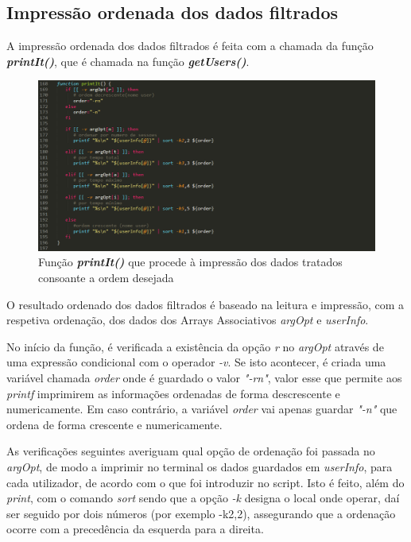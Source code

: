 \documentclass[10pt,portuguese]{article}
\begin{document}
\subsection{Impressão ordenada dos dados filtrados}
\par A impressão ordenada dos dados filtrados é feita com a chamada da função \textbf{\textit{printIt()}}, que é chamada na função \textbf{\textit{getUsers()}}.
\begin{figure}[!h]
    \centering
    \includegraphics[width=\textwidth]{printit.png}
    \caption{Função \textbf{\textit{printIt()}} que procede à impressão dos dados tratados consoante a ordem desejada}
\end{figure}
\par O resultado ordenado dos dados filtrados é baseado na leitura e impressão, com a respetiva ordenação, dos dados dos Arrays Associativos \textit{argOpt} e \textit{userInfo}.
\par No início da função, é verificada a existência da opção \textit{r} no \textit{argOpt} através de uma expressão condicional com o operador \textit{-v}. Se isto acontecer, é criada uma variável chamada \textit{order} onde é guardado o valor \textit{"-rn"}, valor esse que permite aos \textit{printf} imprimirem as informações ordenadas de forma descrescente e numericamente. Em caso contrário, a variável \textit{order} vai apenas guardar \textit{"-n"} que ordena de forma crescente e numericamente.
\par As verificações seguintes averiguam qual opção de ordenação foi passada no \textit{argOpt}, de modo a imprimir no terminal os dados guardados em \textit{userInfo}, para cada utilizador, de acordo com o que foi introduzir no script. Isto é feito, além do \textit{print}, com o comando \textit{sort} sendo que a opção \textit{-k} designa o local onde operar, daí ser seguido por dois números (por exemplo -k2,2), assegurando que a ordenação ocorre com a precedência da esquerda para a direita.
\end{document}
